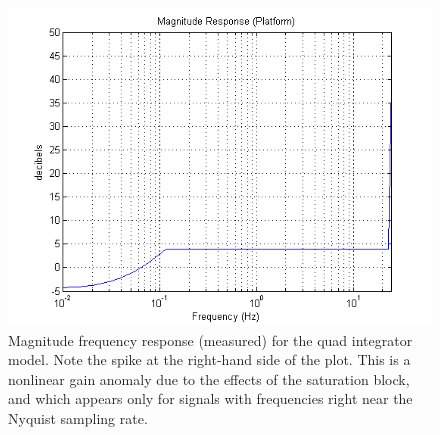 \begin{figure}[htb]
\centering
\includegraphics[width=\columnwidth]{figures/magresp_platform}
    \caption{Magnitude frequency response (measured) for the quad integrator model. Note the 
spike at the right-hand side of the plot.  This is a nonlinear gain anomaly due to the effects
of the saturation block, and which appears only for signals with frequencies right near the 
Nyquist sampling rate.}
    \label{fig:mags2}
\end{figure}

